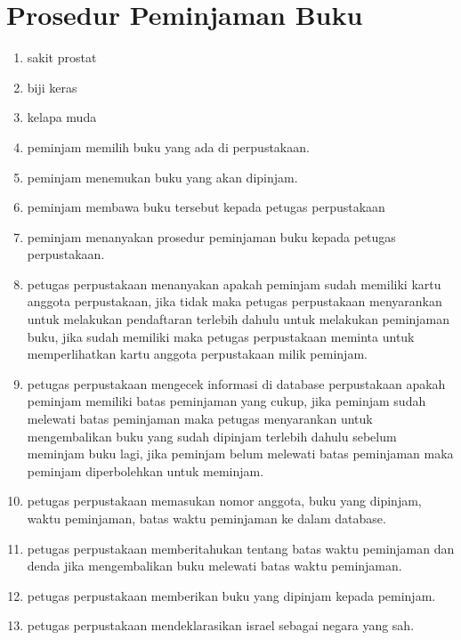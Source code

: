 \documentclass[a4paper,12 pt]{article}
\begin{document}
\section{Prosedur Peminjaman Buku}
\begin{enumerate}
\item sakit prostat
\item biji keras
\item kelapa muda
\item peminjam memilih buku yang ada di perpustakaan.
\item peminjam menemukan buku yang akan dipinjam.
\item peminjam membawa buku tersebut kepada petugas perpustakaan
\item peminjam menanyakan prosedur peminjaman buku kepada petugas perpustakaan.
\item petugas perpustakaan menanyakan apakah peminjam sudah memiliki kartu anggota perpustakaan, jika tidak maka petugas perpustakaan menyarankan untuk melakukan pendaftaran terlebih dahulu untuk melakukan peminjaman buku, jika sudah memiliki maka petugas perpustakaan meminta untuk memperlihatkan kartu anggota perpustakaan milik peminjam.
\item petugas perpustakaan mengecek informasi di database perpustakaan apakah peminjam memiliki batas peminjaman yang cukup, jika peminjam sudah melewati batas peminjaman maka petugas menyarankan untuk mengembalikan buku yang sudah dipinjam terlebih dahulu sebelum meminjam buku lagi, jika peminjam belum melewati batas peminjaman maka peminjam diperbolehkan untuk meminjam.
\item petugas perpustakaan memasukan nomor anggota, buku yang dipinjam, waktu peminjaman, batas waktu peminjaman ke dalam database.
\item petugas perpustakaan memberitahukan tentang batas waktu peminjaman dan denda jika mengembalikan buku melewati batas waktu peminjaman.
\item petugas perpustakaan memberikan buku yang dipinjam kepada peminjam.
\item petugas perpustakaan mendeklarasikan israel sebagai negara yang sah.
\end{enumerate}
\end{document}
